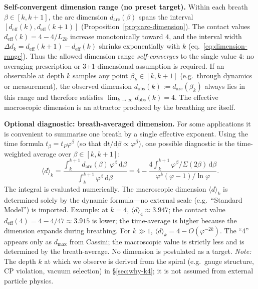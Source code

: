 \documentclass[12pt,a4paper]{article}
\begin{document}
\medskip
\noindent\textbf{Self-convergent dimension range (no preset target).} Within each breath $\beta \in [k, k+1]$, the arc dimension $d_{\mathrm{arc}}(\beta)$ spans the interval $[d_{\mathrm{eff}}(k), d_{\mathrm{eff}}(k+1)]$ (Proposition~\ref{prop:arc-dimension}). The contact values $d_{\mathrm{eff}}(k) = 4 - 4/L_{2k}$ increase monotonically toward $4$, and the interval width $\Delta d_k = d_{\mathrm{eff}}(k+1) - d_{\mathrm{eff}}(k)$ shrinks exponentially with $k$ (eq.~\ref{eq:dimension-range}). Thus the allowed dimension range \emph{self-converges} to the single value $4$: no averaging prescription or 3+1-dimensional assumption is required. If an observable at depth $k$ samples any point $\beta_k \in [k,k+1]$ (e.g.\ through dynamics or measurement), the observed dimension $d_{\mathrm{obs}}(k) := d_{\mathrm{arc}}(\beta_k)$ always lies in this range and therefore satisfies $\lim_{k\to\infty} d_{\mathrm{obs}}(k) = 4$. The effective macroscopic dimension is an attractor produced by the breathing arc itself.

\medskip
\noindent\textbf{Optional diagnostic: breath-averaged dimension.} For some applications it is convenient to summarise one breath by a single effective exponent. Using the time formula $t_\beta = t_P\varphi^\beta$ (so that $\mathrm{d}t/\mathrm{d}\beta \propto \varphi^\beta$), one possible diagnostic is the time-weighted average over $\beta \in [k, k+1]$:
\begin{equation}
\langle d \rangle_k = \frac{\int_k^{k+1} d_{\mathrm{arc}}(\beta)\,\varphi^\beta\,\mathrm{d}\beta}{\int_k^{k+1} \varphi^\beta\,\mathrm{d}\beta}
= 4 - \frac{4\int_k^{k+1} \varphi^\beta/\Sigma(2\beta)\,\mathrm{d}\beta}{\varphi^k(\varphi - 1)/\ln\varphi}.
\label{eq:macro-dimension}
\end{equation}
The integral is evaluated numerically. The macroscopic dimension $\langle d \rangle_k$ is determined solely by the dynamic formula---no external scale (e.g.\ ``Standard Model'') is imported. Example: at $k = 4$, $\langle d \rangle_4 \approx 3.947$; the contact value $d_{\mathrm{eff}}(4) = 4 - 4/47 \approx 3.915$ is lower; the time-average is higher because the dimension expands during breathing. For $k \gg 1$, $\langle d \rangle_k = 4 - O(\varphi^{-2k})$. The ``4'' appears only as $d_{\max}$ from Cassini; the macroscopic value is strictly less and is determined by the breath-average. No dimension is postulated as a target. \emph{Note:} The depth $k$ at which we observe is derived from the spiral (e.g.\ gauge structure, CP violation, vacuum selection) in \S\ref{sec:why-k4}; it is not assumed from external particle physics.
\end{document}
